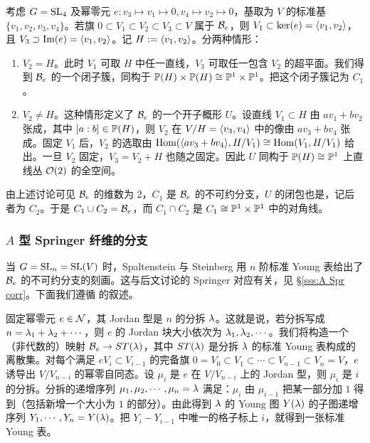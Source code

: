 \subsubsection{} 考虑 $G=\textup{SL}_{4}$ 及幂零元 $e: v_{3}\mapsto v_{1}\mapsto 0, v_{4}\mapsto v_{2}\mapsto 0$，基取为 $V$ 的标准基 $\{v_{1},v_{2},v_{3},v_{4}\}$。若旗 $0\subset V_{1}\subset V_{2}\subset V_{3}\subset V$ 属于 $\mathcal{B}_{e}$，则 $V_{1}\subset \ker(e)=\langle{v_{1},v_{2}}\rangle$，且 $V_{3}\supset\textup{Im}(e)=\langle{v_{1},v_{2}}\rangle$。记 $H:=\langle{v_{1},v_{2}}\rangle$。分两种情形：
\begin{enumerate}
\item $V_{2}=H$。此时 $V_{1}$ 可取 $H$ 中任一直线，$V_{3}$ 可取任一包含 $V_{2}$ 的超平面。我们得到 $\mathcal{B}_{e}$ 的一个闭子簇，同构于 $\mathbb{P}(H)\times \mathbb{P}(H)\cong \mathbb{P}^{1}\times \mathbb{P}^{1}$。把这个闭子簇记为 $C_{1}$。
\item $V_{2}\neq H$。这种情形定义了 $\mathcal{B}_{e}$ 的一个开子概形 $U$。设直线 $V_{1}\subset H$ 由 $av_{1}+bv_{2}$ 张成，其中 $[a:b]\in\mathbb{P}(H)$，则 $V_{2}$ 在 $V/H=\langle{v_{3},v_{4}}\rangle$ 中的像由 $av_{3}+bv_{4}$ 张成。固定 $V_{1}$ 后，$V_{2}$ 的选取由 $\textup{Hom}(\langle{av_{3}+bv_{4}}\rangle, H/V_{1})\cong\textup{Hom}(V_{1},H/V_{1})$ 给出。一旦 $V_{2}$ 固定，$V_{3}=V_{2}+H$ 也随之固定。因此 $U$ 同构于 $\mathbb{P}(H)\cong \mathbb{P}^{1}$ 上直线丛 $\mathcal{O}(2)$ 的全空间。
\end{enumerate}
由上述讨论可见 $\mathcal{B}_{e}$ 的维数为 $2$，$C_{1}$ 是 $\mathcal{B}_{e}$ 的不可约分支，$U$ 的闭包也是，记后者为 $C_{2}$。于是 $C_{1}\cup C_{2}=\mathcal{B}_{e}$，而 $C_{1}\cap C_{2}$ 是 $C_{1}\cong\mathbb{P}^{1}\times\mathbb{P}^{1}$ 中的对角线。

\subsubsection{$A$ 型 Springer 纤维的分支}\label{sss:Spr type A} 当 $G=\textup{SL}_{n}=\textup{SL}(V)$ 时，Spaltenstein \cite{Spa76} 与 Steinberg \cite[]{St} 用 $n$ 阶标准 Young 表给出了 $\mathcal{B}_{e}$ 的不可约分支的刻画。这与后文讨论的 Springer 对应有关，见 \S\ref{sss:A Spr corr}。下面我们遵循 \cite[Ch II, \S5]{Spaltenstein} 的叙述。

固定幂零元 $e\in\mathcal{N}$，其 Jordan 型是 $n$ 的分拆 $\lambda$。这就是说，若分拆写成 $n=\lambda_{1}+\lambda_{2}+\cdots$，则 $e$ 的 Jordan 块大小依次为 $\lambda_{1},\lambda_{2},\cdots$。我们将构造一个（非代数的）映射 $\mathcal{B}_{e}\to ST(\lambda)$，其中 $ST(\lambda)$ 是分拆 $\lambda$ 的标准 Young 表构成的离散集。对每个满足 $eV_{i}\subset V_{i-1}$ 的完备旗 $0=V_{0}\subset V_{1}\subset\cdots\subset V_{n-1}\subset V_{n}=V$，$e$ 诱导出 $V/V_{n-i}$ 的幂零自同态。设 $\mu_{i}$ 是 $e$ 在 $V/V_{n-i}$ 上的 Jordan 型，则 $\mu_{i}$ 是 $i$ 的分拆。分拆的递增序列 $\mu_{1},\mu_{2},\cdots, \mu_{n}=\lambda$ 满足：$\mu_{i}$ 由 $\mu_{i-1}$ 把某一部分加 $1$ 得到（包括新增一个大小为 $1$ 的部分）。由此得到 $\lambda$ 的 Young 图 $Y(\lambda)$ 的子图递增序列 $Y_{1},\cdots, Y_{n}=Y(\lambda)$。把 $Y_{i}-Y_{i-1}$ 中唯一的格子标上 $i$，就得到一张标准 Young 表。

